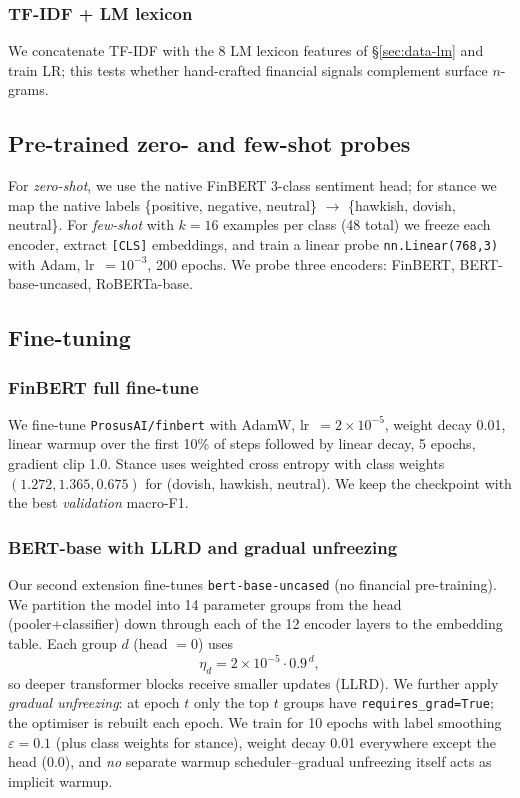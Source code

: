 \documentclass[conference, 10pt, twocolumn]{IEEEtran}
\begin{document}
\subsubsection{TF-IDF + LM lexicon}
We concatenate TF-IDF with the 8 LM lexicon features of
\S\ref{sec:data-lm} and train LR; this tests whether hand-crafted
financial signals complement surface $n$-grams.

\subsection{Pre-trained zero- and few-shot probes}
\label{sec:method-probe}
For \emph{zero-shot}, we use the native FinBERT 3-class sentiment head; for
stance we map the native labels
\{positive, negative, neutral\} $\rightarrow$ \{hawkish, dovish, neutral\}.
For \emph{few-shot} with $k=16$ examples per class (48 total) we freeze
each encoder, extract \texttt{[CLS]} embeddings, and train a linear probe
\texttt{nn.Linear(768,3)} with Adam, lr~$=10^{-3}$, 200 epochs. We probe
three encoders: FinBERT, BERT-base-uncased, RoBERTa-base.

\subsection{Fine-tuning}
\label{sec:method-ft}

\subsubsection{FinBERT full fine-tune}
\label{sec:method-finbert}
We fine-tune \texttt{ProsusAI/finbert} with AdamW, lr~$=2\times10^{-5}$,
weight decay 0.01, linear warmup over the first 10\% of steps followed by
linear decay, 5 epochs, gradient clip 1.0. Stance uses weighted cross
entropy with class weights $(1.272, 1.365, 0.675)$ for
(dovish, hawkish, neutral). We keep the checkpoint with the best
\emph{validation} macro-F1.

\subsubsection{BERT-base with LLRD and gradual unfreezing}
\label{sec:method-bert}
Our second extension fine-tunes \texttt{bert-base-uncased} (no financial
pre-training). We partition the model into 14 parameter groups from the
head (pooler+classifier) down through each of the 12 encoder layers to the
embedding table. Each group $d$ (head $= 0$) uses
\begin{equation}
\eta_d = 2\times10^{-5} \cdot 0.9^{\,d},
\end{equation}
so deeper transformer blocks receive smaller updates (LLRD). We further
apply \emph{gradual unfreezing}: at epoch $t$ only the top $t$ groups have
\texttt{requires\_grad=True}; the optimiser is rebuilt each epoch.
We train for 10 epochs with label smoothing $\varepsilon = 0.1$ (plus
class weights for stance), weight decay 0.01 everywhere except the head
(0.0), and \emph{no} separate warmup scheduler--gradual unfreezing itself
acts as implicit warmup.
\end{document}
